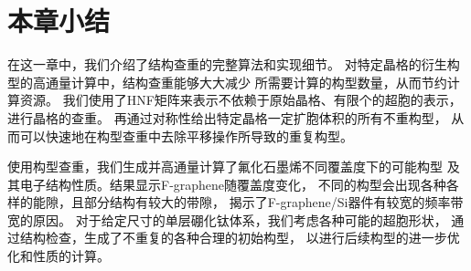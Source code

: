 \section{本章小结}

在这一章中，我们介绍了结构查重的完整算法和实现细节。
对特定晶格的衍生构型的高通量计算中，结构查重能够大大减少
所需要计算的构型数量，从而节约计算资源。
我们使用了HNF矩阵来表示不依赖于原始晶格、有限个的超胞的表示，进行晶格的查重。
再通过对称性给出特定晶格一定扩胞体积的所有不重构型，
从而可以快速地在构型查重中去除平移操作所导致的重复构型。

使用构型查重，我们生成并高通量计算了氟化石墨烯不同覆盖度下的可能构型
及其电子结构性质。结果显示F-graphene随覆盖度变化，
不同的构型会出现各种各样的能隙，且部分结构有较大的带隙，
揭示了F-graphene/Si器件有较宽的频率带宽的原因。
对于给定尺寸的单层硼化钛体系，我们考虑各种可能的超胞形状，
通过结构检查，生成了不重复的各种合理的初始构型，
以进行后续构型的进一步优化和性质的计算。

